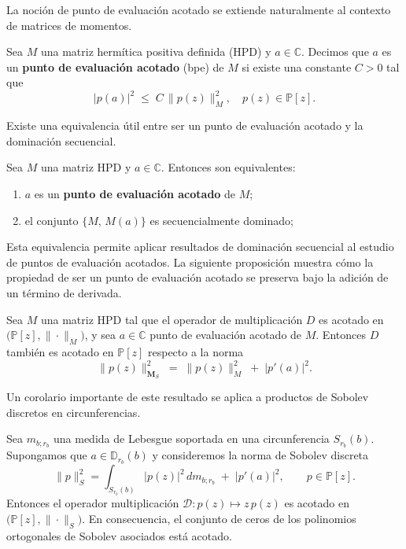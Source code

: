 La noción de punto de evaluación acotado se extiende naturalmente al contexto de matrices de momentos.

\begin{definition}\label{def:bounded_eval_point_matrix}
  \cite{escribano2025zeros} Sea $M$ una matriz hermítica positiva definida (HPD) y $a\in\mathbb{C}$.
  Decimos que $a$ es un \textbf{punto de evaluación acotado} (bpe) de $M$ si existe una constante $C>0$ tal que
  \[ |p(a)|^{2}\;\le\;C\,\|p(z)\|_{M}^{2}, \quad p(z)\in\mathbb{P}[z]. \]
\end{definition}

Existe una equivalencia útil entre ser un punto de evaluación acotado y la dominación secuencial.

\begin{proposition}\label{prop:equiv_bounded_eval_point}
  \cite{escribano2025zeros} Sea $M$ una matriz HPD y $a\in\mathbb{C}$. Entonces son equivalentes:
  \begin{enumerate}
    \item $a$ es un \textbf{punto de evaluación acotado} de $M$;
    \item el conjunto $\{M,\,M(a)\}$ es secuencialmente dominado;
  \end{enumerate}
\end{proposition}

Esta equivalencia permite aplicar resultados de dominación secuencial al estudio de puntos de evaluación acotados. La siguiente proposición muestra cómo la propiedad de ser un punto de evaluación acotado se preserva bajo la adición de un término de derivada.

\begin{proposition}\label{prop:bounded_derivative_eval}
  \cite{escribano2025zeros} Sea $M$ una matriz HPD tal que el operador de multiplicación $D$
  es acotado en $\bigl(\mathbb{P}[z],\|\cdot\|_{M}\bigr)$, y sea $a\in\mathbb{C}$ punto de evaluación acotado de $M$.
  Entonces $D$ también es acotado en $\mathbb{P}[z]$ respecto a la norma
  \[
    \|p(z)\|_{\textbf{M}_{S}}^{2}\;=\;\|p(z)\|_{M}^{2}\;+\;
    \bigl|p'(a)\bigr|^{2}.
  \]
\end{proposition}

Un corolario importante de este resultado se aplica a productos de Sobolev discretos en circunferencias.

\begin{corollary}\label{cor:bounded_zeros_circle}
  \cite{escribano2025zeros}
  Sea $m_{b;r_b}$ una medida de Lebesgue soportada en una circunferencia $S_{r_b}(b)$.
  Supongamos que $a\in \mathbb{D}_{r_b}(b)$ y consideremos la norma de Sobolev discreta
  \[
    \|p\|_{S}^{2}= \int_{S_{r_b}(b)} |p(z)|^{2}\,dm_{b;r_b}\;+\;\bigl|p'(a)\bigr|^{2},
    \qquad p\in\mathbb{P}[z].
  \]
  Entonces el operador multiplicación $\mathcal{D}\colon p(z)\mapsto z\,p(z)$
  es acotado en $\bigl(\mathbb{P}[z],\|\cdot\|_{S}\bigr)$.
  En consecuencia, el conjunto de ceros de los polinomios ortogonales de Sobolev asociados está acotado.
\end{corollary}

